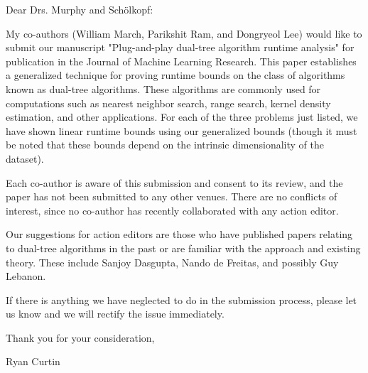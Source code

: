 \documentclass[twoside,11pt]{article} %
\begin{document}
\noindent Dear Drs. Murphy and Schölkopf: \\

\medskip

My co-authors (William March, Parikshit Ram, and Dongryeol Lee) would like to
submit our manuscript "Plug-and-play dual-tree algorithm runtime analysis" for
publication in the Journal of Machine Learning Research.  This paper establishes
a generalized technique for proving runtime bounds on the class of algorithms
known as dual-tree algorithms.  These algorithms are commonly used for
computations such as nearest neighbor search, range search, kernel density
estimation, and other applications.  For each of the three problems just listed,
we have shown linear runtime bounds using our generalized bounds (though it must
be noted that these bounds depend on the intrinsic dimensionality of the
dataset). \\

\medskip

Each co-author is aware of this submission and consent to its review, and the
paper has not been submitted to any other venues.  There are no conflicts of
interest, since no co-author has recently collaborated with any action editor.
\\
\medskip

Our suggestions for action editors are those who have published papers relating
to dual-tree algorithms in the past or are familiar with the approach and
existing theory.  These include Sanjoy Dasgupta, Nando de Freitas, and possibly
Guy Lebanon. \\
\medskip

If there is anything we have neglected to do in the submission process, please
let us know and we will rectify the issue immediately. \\

\medskip

\noindent Thank you for your consideration, \\

\medskip

\noindent Ryan Curtin
\end{document}
